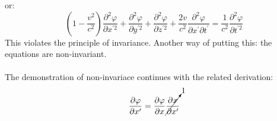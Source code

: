 \documentclass[journal]{IEEEtran}
\begin{document}
or:
\begin{equation}
\boxed{
\left(1 - \frac{v^2}{c^2}\right)
\frac{\partial^2\varphi}{\partial x^{\prime2}} +
\frac{\partial^2\varphi}{\partial y^{\prime2}} +
\frac{\partial^2\varphi}{\partial z^{\prime2}}  +
\frac{2v}{c^2}
\frac{\partial^2\varphi}{\partial x^\prime\partial t^\prime} =
\frac{1}{c^2}\frac{\partial^2\varphi}{\partial t^{\prime2}}
}
\end{equation}
This violates the principle of invariance.  Another way of putting
this:  the equations are non-invariant.\\\\The demonstration of
non-invariace continues with the related derivation:
\begin{equation}
\frac{\partial\varphi}{\partial x^{\prime}} =
\frac{\partial\varphi}{\partial x}\cancelto{1}{\frac{\partial x}{\partial x^\prime}}
\end{equation}
\end{document}

